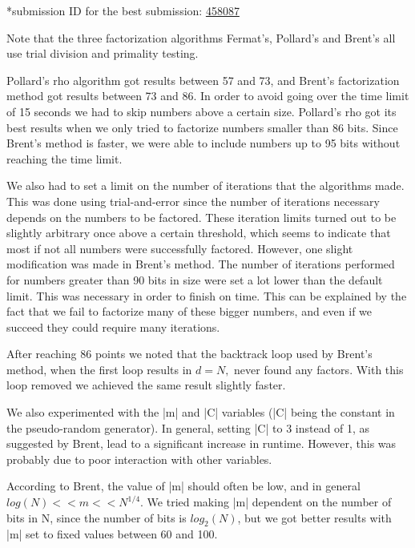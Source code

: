 \documentclass[paper=a4, fontsize=11pt,numbers=endperiod]{scrartcl} %
\numberwithin{equation}{section} %
\numberwithin{figure}{section} %
\numberwithin{table}{section} %
\begin{document}
    \footnotesize{*submission ID for the best submission: \href{https://kth.kattis.scrool.se/submission?id=458087}{458087}
    \normalsize

Note that the three factorization algorithms Fermat's, Pollard's and Brent's all use trial division and primality testing.

Pollard's rho algorithm got results between 57 and 73, and Brent's factorization method got results between 73 and 86.
In order to avoid going over the time limit of 15 seconds we had to skip numbers above a certain size.
Pollard's rho got its best results when we only tried to factorize numbers smaller than 86 bits.
Since Brent's method is faster, we were able to include numbers up to 95 bits without reaching the time limit.

We also had to set a limit on the number of iterations that the algorithms made.
This was done using trial-and-error since the number of iterations necessary depends on the numbers to be factored.
These iteration limits turned out to be slightly arbitrary once above a certain threshold, which seems to indicate that most if not all numbers were successfully factored.
However, one slight modification was made in Brent's method.
The number of iterations performed for numbers greater than 90 bits in size were set a lot lower than the default limit.
This was necessary in order to finish on time.
This can be explained by the fact that we fail to factorize many of these bigger numbers, 
and even if we succeed they could require many iterations.

After reaching 86 points we noted that the backtrack loop used by Brent's method, when the first loop results in $d = N,$ never found any factors.
With this loop removed we achieved the same result slightly faster.

We also experimented with the |m| and |C| variables (|C| being the constant in the pseudo-random generator).
In general, setting |C| to 3 instead of 1, as suggested by Brent, lead to a significant increase in runtime.
However, this was probably due to poor interaction with other variables.

According to Brent, the value of |m| should often be low, and in general $log(N) << m << N^{1/4}$.
We tried making |m| dependent on the number of bits in N, since the number of bits is $log_2(N)$, but we got better results with |m| set to fixed values between 60 and 100.



}
\end{document}
